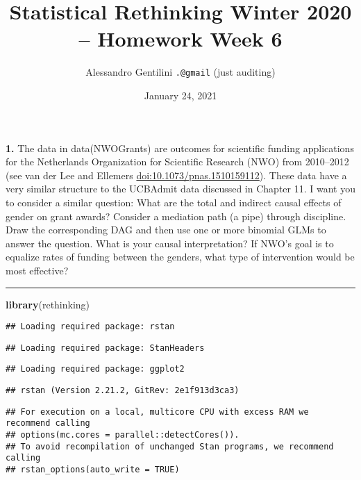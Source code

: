 \documentclass[]{article}
\title{Statistical Rethinking Winter 2020 -- Homework Week 6}
\author{Alessandro Gentilini \texttt{.@gmail} (just auditing)}
\date{January 24, 2021}
\newenvironment{Shaded}{\begin{snugshade}}{\end{snugshade}}
\newcommand{\KeywordTok}[1]{\textcolor[rgb]{0.13,0.29,0.53}{\textbf{{#1}}}}
\newcommand{\NormalTok}[1]{{#1}}
\begin{document}
\maketitle

\textbf{1.} The data in data(NWOGrants) are outcomes for scientific
funding applications for the Netherlands Organization for Scientific
Research (NWO) from 2010--2012 (see van der Lee and Ellemers
\url{doi:10.1073/pnas.1510159112}). These data have a very similar
structure to the UCBAdmit data discussed in Chapter 11. I want you to
consider a similar question: What are the total and indirect causal
effects of gender on grant awards? Consider a mediation path (a pipe)
through discipline. Draw the corresponding DAG and then use one or more
binomial GLMs to answer the question. What is your causal
interpretation? If NWO's goal is to equalize rates of funding between
the genders, what type of intervention would be most effective?

\begin{center}\rule{0.5\linewidth}{0.5pt}\end{center}

\begin{Shaded}
\begin{Highlighting}[]
\KeywordTok{library}\NormalTok{(rethinking)}
\end{Highlighting}
\end{Shaded}

\begin{verbatim}
## Loading required package: rstan
\end{verbatim}

\begin{verbatim}
## Loading required package: StanHeaders
\end{verbatim}

\begin{verbatim}
## Loading required package: ggplot2
\end{verbatim}

\begin{verbatim}
## rstan (Version 2.21.2, GitRev: 2e1f913d3ca3)
\end{verbatim}

\begin{verbatim}
## For execution on a local, multicore CPU with excess RAM we recommend calling
## options(mc.cores = parallel::detectCores()).
## To avoid recompilation of unchanged Stan programs, we recommend calling
## rstan_options(auto_write = TRUE)
\end{verbatim}
\end{document}
